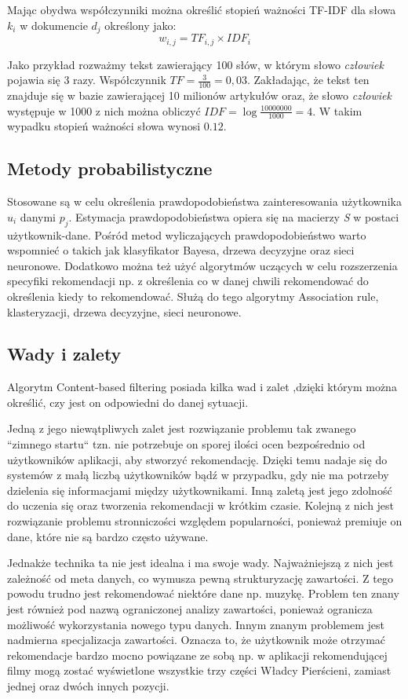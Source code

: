 Mając obydwa współczynniki można określić stopień ważności TF-IDF dla słowa $k_i$ w dokumencie $d_j$ określony jako:
\begin{equation}
w_{i,j} = TF_{i,j} \times IDF_i
\end{equation}

Jako przykład rozważmy tekst zawierający 100 słów, w którym słowo \textit{człowiek} pojawia się 3 razy. Współczynnik $TF = \frac{3}{100} = 0,03$. Zakładając, że tekst ten znajduje się w bazie zawierającej 10 milionów artykułów oraz, że słowo \textit{człowiek} występuje w 1000 z nich można obliczyć $IDF = \log{\frac{10000000}{1000}} = 4$. W takim wypadku stopień ważności słowa wynosi $0.12$.

\subsection{Metody probabilistyczne}
Stosowane są w celu określenia prawdopodobieństwa zainteresowania użytkownika $u_i$ danymi $p_j$. Estymacja prawdopodobieństwa opiera się na macierzy \textit{S} w postaci użytkownik-dane. Pośród metod wyliczających prawdopodobieństwo warto wspomnieć o takich jak klasyfikator Bayesa, drzewa decyzyjne oraz sieci neuronowe.  Dodatkowo można też użyć algorytmów uczących w celu rozszerzenia specyfiki rekomendacji np. z określenia co w danej chwili rekomendować do określenia kiedy to rekomendować. Służą do tego algorytmy Association rule, klasteryzacji, drzewa decyzyjne, sieci neuronowe.  

\subsection{Wady i zalety}

Algorytm Content-based filtering posiada kilka wad i zalet ,dzięki którym można określić, czy jest on odpowiedni do danej sytuacji. 

Jedną z jego niewątpliwych zalet jest rozwiązanie problemu tak zwanego ``zimnego startu`` tzn. nie potrzebuje on sporej ilości ocen bezpośrednio od użytkowników aplikacji, aby stworzyć rekomendację. Dzięki temu nadaje się do systemów z małą liczbą użytkowników bądź w przypadku, gdy nie ma potrzeby dzielenia się informacjami między użytkownikami. Inną zaletą jest jego zdolność do uczenia się oraz tworzenia rekomendacji w krótkim czasie. Kolejną z nich jest rozwiązanie problemu stronniczości względem popularności, ponieważ premiuje on dane, które nie są bardzo często używane. 

Jednakże technika ta nie jest idealna i ma swoje wady. Najważniejszą z nich jest zależność od meta danych, co wymusza pewną strukturyzację zawartości. Z tego powodu trudno jest rekomendować niektóre dane np. muzykę. Problem ten znany jest również pod nazwą ograniczonej analizy zawartości, ponieważ ogranicza możliwość wykorzystania nowego typu danych. Innym znanym problemem jest nadmierna specjalizacja zawartości. Oznacza to, że użytkownik może otrzymać rekomendacje bardzo mocno powiązane ze sobą np. w aplikacji rekomendującej filmy mogą zostać wyświetlone wszystkie trzy części Władcy Pierścieni, zamiast jednej oraz dwóch innych pozycji.


